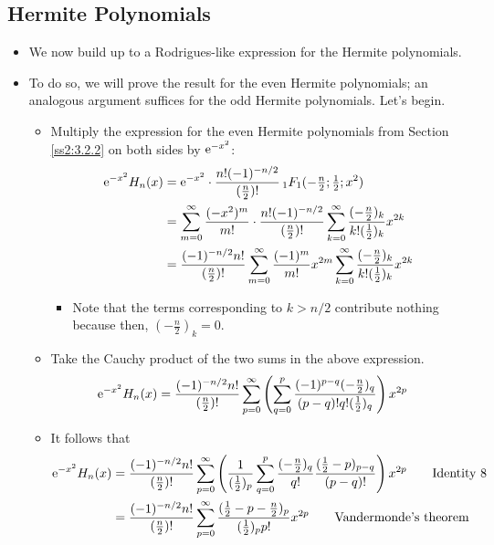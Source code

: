 \documentclass[../finalProject.tex]{subfiles}
\begin{document}
\subsection{Hermite Polynomials}
\begin{itemize}
    \item We now build up to a Rodrigues-like expression for the Hermite polynomials.
    \item To do so, we will prove the result for the even Hermite polynomials; an analogous argument suffices for the odd Hermite polynomials. Let's begin.
    \begin{itemize}
        \item Multiply the expression for the even Hermite polynomials from Section \ref{ss2:3.2.2} on both sides by $\e[-x^2]$:
        \begin{align*}
            \e[-x^2]H_n(x) &= \e[-x^2]\cdot\frac{n!(-1)^{-n/2}}{(\tfrac{n}{2})!}\,{}_1F_1(-\tfrac{n}{2};\tfrac{1}{2};x^2)\\
            &= \sum_{m=0}^\infty\frac{(-x^2)^m}{m!}\cdot\frac{n!(-1)^{-n/2}}{(\tfrac{n}{2})!}\sum_{k=0}^\infty\frac{(-\tfrac{n}{2})_k}{k!(\tfrac{1}{2})_k}x^{2k}\\
            &= \frac{(-1)^{-n/2}n!}{(\tfrac{n}{2})!}\sum_{m=0}^\infty\frac{(-1)^m}{m!}x^{2m}\sum_{k=0}^\infty\frac{(-\tfrac{n}{2})_k}{k!(\tfrac{1}{2})_k}x^{2k}
        \end{align*}
        \begin{itemize}
            \item Note that the terms corresponding to $k>n/2$ contribute nothing because then, $(-\tfrac{n}{2})_k=0$.
        \end{itemize}
        \item Take the Cauchy product of the two sums in the above expression.
        \begin{align*}
            \e[-x^2]H_n(x) &= \frac{(-1)^{-n/2}n!}{(\tfrac{n}{2})!}\sum_{p=0}^\infty\left( \sum_{q=0}^p\frac{(-1)^{p-q}(-\tfrac{n}{2})_q}{(p-q)!q!(\tfrac{1}{2})_q} \right)x^{2p}
        \end{align*}
        \item It follows that
        \begin{align*}
            \e[-x^2]H_n(x) &= \frac{(-1)^{-n/2}n!}{(\tfrac{n}{2})!}\sum_{p=0}^\infty\left( \frac{1}{(\tfrac{1}{2})_p}\sum_{q=0}^p\frac{(-\tfrac{n}{2})_q}{q!}\frac{(\tfrac{1}{2}-p)_{p-q}}{(p-q)!} \right)x^{2p}\tag*{Identity 8}\\
            &= \frac{(-1)^{-n/2}n!}{(\tfrac{n}{2})!}\sum_{p=0}^\infty\frac{(\tfrac{1}{2}-p-\tfrac{n}{2})_p}{(\tfrac{1}{2})_pp!}x^{2p}\tag*{Vandermonde's theorem}\\

\end{align*}
\end{itemize}
\end{itemize}
\end{document}
